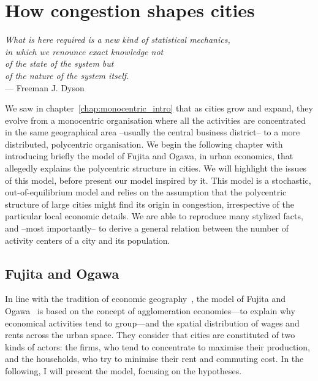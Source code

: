 \chapter{How congestion shapes cities}
\label{chap:monocentric_model}

\begin{flushright}{\slshape    
What is here required is a new kind of statistical mechanics,\\
in which we renounce exact knowledge not\\
of the state of the system but\\
of the nature of the system itself.}  \\ \medskip
--- Freeman J. Dyson~\cite{Dyson:1962}
\end{flushright}


\bigskip


We saw in chapter~\ref{chap:monocentric_intro} that as cities grow and expand,
they evolve from a monocentric organisation where all the activities are
concentrated in the same geographical area --usually the central business
district-- to a more distributed, polycentric organisation. We begin the
following chapter with introducing briefly the model of Fujita and Ogawa, in
urban economics, that allegedly explains the polycentric structure in cities. We
will highlight the issues of this model, before present our model inspired by
it. This model is a stochastic, out-of-equilibrium model and relies on the
assumption that the polycentric structure of large cities might find its origin
in congestion, irrespective of the particular local economic details. We are
able to reproduce many stylized facts, and --most importantly-- to derive a
general relation between the number of activity centers of a city and its
population. 


\section{Fujita and Ogawa}
\label{sec:fujita_and_ogawa}

In line with the tradition of economic geography~\cite{Fujita:2001}, the model
of Fujita and Ogawa~\cite{Fujita:1982} is based on the concept of agglomeration
economies---to explain why economical activities tend to group---and the spatial
distribution of wages and rents across the urban space. They consider that
cities are constituted of two kinds of actors: the firms, who tend to
concentrate to maximise their production, and the households, who try to
minimise their rent and commuting cost. In the following, I will present the
model, focusing on the hypotheses.\\ 

